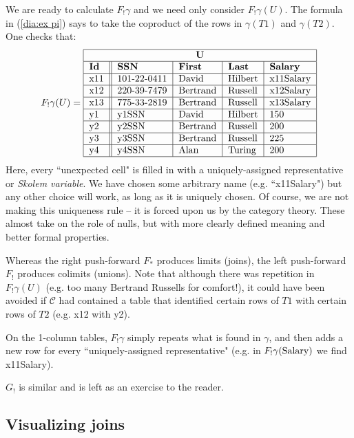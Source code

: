 \documentclass{amsart}
\def\tn{\textnormal}
\def\mc{\mathcal}
\def\mcC{\mc{C}}
\theoremstyle{remark}
\theoremstyle{definition}
\begin{document}
We are ready to calculate $F_!\gamma$ and we need only consider $F_!\gamma(U)$.  The formula in (\ref{dia:ex pi}) says to take the coproduct of the rows in $\gamma(T1)$ and $\gamma(T2)$.  One checks that:  \begin{align*}F_!\gamma(U)=\begin{tabular}{| l || l | l | l | l |}\hline\multicolumn{5}{| c |}{\bf U}\\\hline{\bf Id}&{\bf SSN}&{\bf First}&{\bf Last}&{\bf Salary}\\\hline x11&101-22-0411&David&Hilbert&x11Salary\\\hline x12&220-39-7479&Bertrand&Russell&x12Salary\\\hline x13&775-33-2819&Bertrand&Russell&x13Salary\\\hline y1&y1SSN&David&Hilbert&150\\\hline y2&y2SSN&Bertrand&Russell&200\\\hline y3&y3SSN&Bertrand&Russell&225\\\hline y4&y4SSN&Alan&Turing&200\\\hline\end{tabular}\end{align*}  Here, every ``unexpected cell" is filled in with a uniquely-assigned representative or {\em Skolem variable}.  We have chosen some arbitrary name (e.g. ``x11Salary") but any other choice will work, as long as it is uniquely chosen.  Of course, we are not making this uniqueness rule -- it is forced upon us by the category theory.  These almost take on the role of nulls, but with more clearly defined meaning and better formal properties.  


Whereas the right push-forward $F_*$ produces limits (joins), the left push-forward $F_!$ produces colimits (unions).  Note that although there was repetition in $F_!\gamma(U)$ (e.g. too many Bertrand Russells for comfort!), it could have been avoided if $\mcC$ had contained a table that identified certain rows of $T1$ with certain rows of $T2$ (e.g. x12 with y2).

On the 1-column tables, $F_!\gamma$ simply repeats what is found in $\gamma$, and then adds a new row for every ``uniquely-assigned representative" (e.g. in $F_!\gamma(\tn{Salary})$ we find x11Salary). 

$G_!$ is similar and is left as an exercise to the reader.

\subsection{Visualizing joins}\label{sec:visualizing joins}
\end{document}
